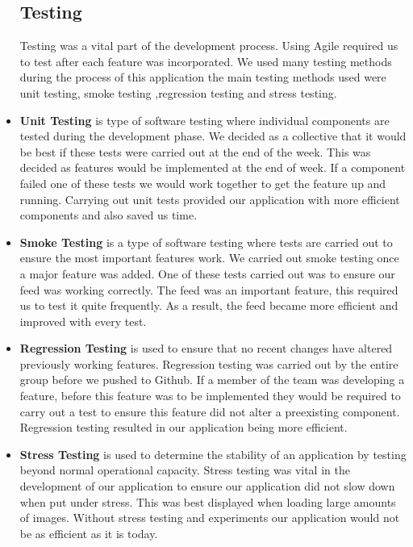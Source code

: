 \begin{itemize}
\subsection{Testing}
Testing was a vital part of the development process. Using Agile required us to test after each feature was incorporated. We used many testing methods during the process of this application the main testing methods used were unit testing, smoke testing ,regression testing and stress testing.

\item \textbf{Unit Testing}
 is type of software testing where individual components are tested during the development phase. \newline
We decided as a collective that it would be best if these tests were carried out at the end of the week. This was decided as features would be implemented at the end of week. If a component failed one of these tests we would work together to get the feature up and running. Carrying out unit tests provided our application with more efficient components and also saved us time.

\item \textbf{Smoke Testing}
 is a type of software testing where tests are carried out to ensure the most important features work.\newline
We carried out smoke testing once a major feature was added. One of these tests carried out was to ensure our feed was working correctly. The feed was an important feature, this required us to test it quite frequently. As a result, the feed became more efficient and improved with every test.

\item \textbf{Regression Testing}
 is used to ensure that no recent changes have altered previously working features.\newline
Regression testing was carried out by the entire group before we pushed to Github. If a member of the team was developing a feature, before this feature was to be implemented they would be required to carry out a test to ensure this feature did not alter a preexisting component. Regression testing resulted in our application being more efficient.

\item \textbf{Stress Testing}
 is used to determine the stability of an application by testing beyond normal operational capacity.\newline
Stress testing was vital in the development of our application to ensure our application did not slow down when put under stress. This was best displayed when loading large amounts of images. Without stress testing and experiments our application would not be as efficient as it is today.


\end{itemize}
